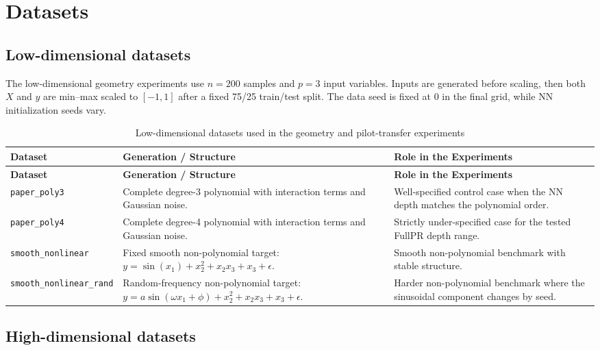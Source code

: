 \documentclass[UTF8,a4paper,11pt]{ctexart}
\begin{document}
\section{Datasets}

\subsection{Low-dimensional datasets}

The low-dimensional geometry experiments use $n=200$ samples and $p=3$ input variables. Inputs are generated before scaling, then both $X$ and $y$ are min--max scaled to $[-1,1]$ after a fixed 75/25 train/test split. The data seed is fixed at 0 in the final grid, while NN initialization seeds vary.

\begin{longtable}{L{0.22\textwidth}L{0.34\textwidth}L{0.34\textwidth}}
\caption{Low-dimensional datasets used in the geometry and pilot-transfer experiments}
\label{tab:lowdim-datasets} \\
\toprule
\textbf{Dataset} & \textbf{Generation / Structure} & \textbf{Role in the Experiments} \\
\midrule
\endfirsthead
\toprule
\textbf{Dataset} & \textbf{Generation / Structure} & \textbf{Role in the Experiments} \\
\midrule
\endhead
\bottomrule
\endlastfoot

\texttt{paper\_poly3}
& Complete degree-3 polynomial with interaction terms and Gaussian noise.
& Well-specified control case when the NN depth matches the polynomial order. \\

\texttt{paper\_poly4}
& Complete degree-4 polynomial with interaction terms and Gaussian noise.
& Strictly under-specified case for the tested FullPR depth range. \\

\texttt{smooth\_nonlinear}
& Fixed smooth non-polynomial target:
$y=\sin(x_1)+x_2^2+x_2x_3+x_3+\epsilon$.
& Smooth non-polynomial benchmark with stable structure. \\

\texttt{smooth\_nonlinear\_rand}
& Random-frequency non-polynomial target:
$y=a\sin(\omega x_1+\phi)+x_2^2+x_2x_3+x_3+\epsilon$.
& Harder non-polynomial benchmark where the sinusoidal component changes by seed. \\

\end{longtable}

\subsection{High-dimensional datasets}
\end{document}
